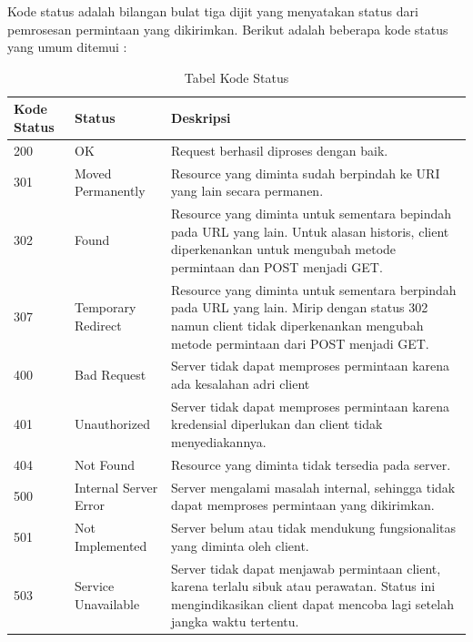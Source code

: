 Kode status adalah bilangan bulat tiga dijit yang menyatakan status dari pemrosesan permintaan yang dikirimkan. Berikut adalah beberapa kode status yang umum ditemui : 

\begin{table}[H]
\centering
\begin{tabular}{|p{3cm}|p{5cm}|p{5cm}|}
\hline
\textbf{Kode Status} & \textbf{Status}               & \textbf{Deskripsi}\\\hline
200         & OK                   & Request berhasil diproses dengan baik.                                                                                                                                         \\\hline
301         & Moved Permanently    & Resource yang diminta sudah berpindah ke URI yang lain secara permanen.                                                                                                        \\\hline
302         & Found                & Resource yang diminta untuk sementara bepindah pada URL yang lain. Untuk alasan historis, client diperkenankan untuk mengubah metode permintaan dan POST menjadi GET.          \\
307         & Temporary Redirect   & Resource yang diminta untuk sementara berpindah pada URL yang lain. Mirip dengan status 302 namun client tidak diperkenankan mengubah metode permintaan dari POST menjadi GET. \\\hline
400         & Bad Request          & Server tidak dapat memproses permintaan karena ada kesalahan adri client                                                                                                       \\\hline
401         & Unauthorized         & Server tidak dapat memproses permintaan karena kredensial diperlukan dan client tidak menyediakannya.                                                                          \\\hline
404         & Not Found            & Resource yang diminta tidak tersedia pada server.                                                                                                                              \\\hline
500         & Internal Server Error & Server mengalami masalah internal, sehingga tidak dapat memproses permintaan yang dikirimkan.                                                                                  \\\hline
501         & Not Implemented      & Server belum atau tidak mendukung fungsionalitas yang diminta oleh client.                                                                                                     \\\hline
503         & Service Unavailable  & Server tidak dapat menjawab permintaan client, karena terlalu sibuk atau perawatan. Status ini mengindikasikan client dapat mencoba lagi setelah jangka waktu tertentu.  \\\hline     
\end{tabular}
\caption[Tabel Kode Status]{Tabel Kode Status}
\label{table:kodestatus}
\end{table}

